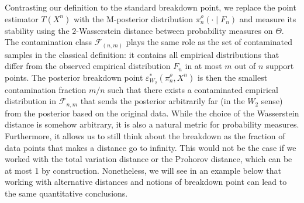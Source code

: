 \documentclass[11pt, oneside]{amsart}
\theoremstyle{definition}   %
\newcommand{\loss}{\rho}
\newcommand{\mposterior}{\pi_n^{\loss}}
\begin{document}
%
Contrasting our definition to the standard breakdown point, we replace the point estimator $T(X^n)$ with the M-posterior distribution $\mposterior(\cdot\mid F_n)$ and measure its stability using the $2$-Wasserstein distance between probability measures on $\Theta$. 
%
The contamination class $\mathcal{F}_{(n,m)}$ plays the same role as the set of contaminated samples in the classical definition: it contains all empirical distributions that differ from the observed empirical distribution $F_n$ in at most $m$ out of $n$ support points. 
%
The posterior breakdown point $\varepsilon^*_{W_2}(\pi_n^\rho,X^n)$ is then the smallest contamination fraction $m/n$  such that there exists a contaminated empirical distribution in $\mathcal{F}_{n,m}$ that sends the posterior arbitrarily far (in the $W_2$ sense) from the posterior based on the original data. While the choice of the Wasserstein distance  is somehow arbitrary, it is also a natural metric for probability measures. Furthermore, it allows us to still think about the breakdown as the fraction of data points that makes a distance go to infinity. This would not be the case if we worked with the total variation distance or the Prohorov distance,  which can be at most 1 by construction. Nonetheless, we will see in an example below that working with alternative distances and notions of breakdown point can lead to the same quantitative conclusions.
\end{document}
